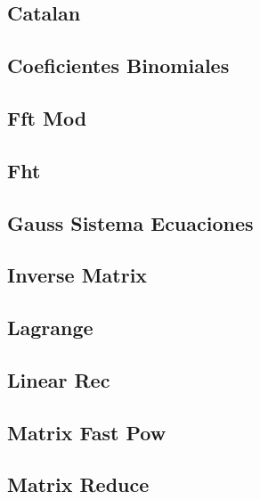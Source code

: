 \documentclass[10pt,portrait,twocolumn,a4paper,notitlepage]{article}
\newcommand\cppfile[2][]{%
\ifstrempty{#1}{}{}%
}
\begin{document}
\subsection{Catalan}
\cppfile{math_clean/catalan.cpp}

\subsection{Coeficientes Binomiales}
\cppfile{math_clean/coeficientes_binomiales.cpp}

\subsection{Fft Mod}
\cppfile{math_clean/fft_mod.cpp}

\subsection{Fht}
\cppfile{math_clean/fht.cpp}

\subsection{Gauss Sistema Ecuaciones}
\cppfile{math_clean/gauss_sistema_ecuaciones.cpp}

\subsection{Inverse Matrix}
\cppfile{math_clean/inverse_matrix.cpp}

\subsection{Lagrange}
\cppfile{math_clean/lagrange.cpp}

\subsection{Linear Rec}
\cppfile{math_clean/linear_rec.cpp}

\subsection{Matrix Fast Pow}
\cppfile{math_clean/matrix_fast_pow.cpp}

\subsection{Matrix Reduce}
\cppfile{math_clean/matrix_reduce.cpp}
\end{document}
